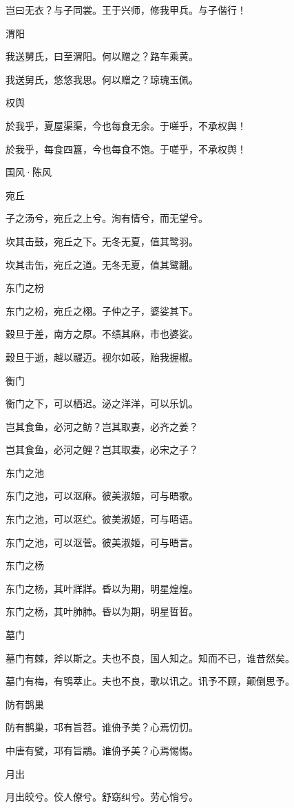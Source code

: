 岂曰无衣？与子同裳。王于兴师，修我甲兵。与子偕行！

渭阳

我送舅氏，曰至渭阳。何以赠之？路车乘黄。

我送舅氏，悠悠我思。何以赠之？琼瑰玉佩。

权舆

於我乎，夏屋渠渠，今也每食无余。于嗟乎，不承权舆！

於我乎，每食四簋，今也每食不饱。于嗟乎，不承权舆！




国风·陈风


宛丘

子之汤兮，宛丘之上兮。洵有情兮，而无望兮。

坎其击鼓，宛丘之下。无冬无夏，值其鹭羽。

坎其击缶，宛丘之道。无冬无夏，值其鹭翿。

东门之枌

东门之枌，宛丘之栩。子仲之子，婆娑其下。

穀旦于差，南方之原。不绩其麻，市也婆娑。

穀旦于逝，越以鬷迈。视尔如荍，贻我握椒。

衡门

衡门之下，可以栖迟。泌之洋洋，可以乐饥。

岂其食鱼，必河之鲂？岂其取妻，必齐之姜？

岂其食鱼，必河之鲤？岂其取妻，必宋之子？

东门之池

东门之池，可以沤麻。彼美淑姬，可与晤歌。

东门之池，可以沤纻。彼美淑姬，可与晤语。

东门之池，可以沤菅。彼美淑姬，可与晤言。

东门之杨

东门之杨，其叶牂牂。昏以为期，明星煌煌。

东门之杨，其叶肺肺。昏以为期，明星晢晢。

墓门

墓门有棘，斧以斯之。夫也不良，国人知之。知而不已，谁昔然矣。

墓门有梅，有鸮萃止。夫也不良，歌以讯之。讯予不顾，颠倒思予。

防有鹊巢

防有鹊巢，邛有旨苕。谁侜予美？心焉忉忉。

中唐有甓，邛有旨鷊。谁侜予美？心焉惕惕。

月出

月出皎兮。佼人僚兮。舒窈纠兮。劳心悄兮。

